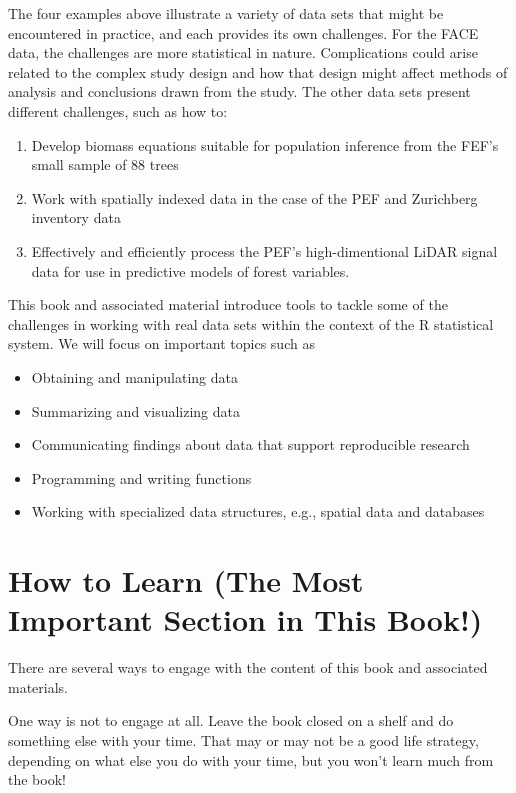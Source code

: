 \documentclass[]{krantz}
\providecommand{\tightlist}{%
  \setlength{\itemsep}{0pt}\setlength{\parskip}{0pt}}
\begin{document}
The four examples above illustrate a variety of data sets that might be encountered in practice, and each provides its own challenges. For the FACE data, the challenges are more statistical in nature. Complications could arise related to the complex study design and how that design might affect methods of analysis and conclusions drawn from the study. The other data sets present different challenges, such as how to:

\begin{enumerate}
\def\labelenumi{\arabic{enumi}.}
\tightlist
\item
  Develop biomass equations suitable for population inference from the FEF's small sample of 88 trees
\item
  Work with spatially indexed data in the case of the PEF and Zurichberg inventory data
\item
  Effectively and efficiently process the PEF's high-dimentional LiDAR signal data for use in predictive models of forest variables.
\end{enumerate}

This book and associated material introduce tools to tackle some of the challenges in working with real data sets within the context of the R statistical system. We will focus on important topics such as

\begin{itemize}
\tightlist
\item
  Obtaining and manipulating data
\item
  Summarizing and visualizing data
\item
  Communicating findings about data that support reproducible research
\item
  Programming and writing functions
\item
  Working with specialized data structures, e.g., spatial data and databases
\end{itemize}

\hypertarget{how-to-learn-the-most-important-section-in-this-book}{%
\section{How to Learn (The Most Important Section in This Book!)}\label{how-to-learn-the-most-important-section-in-this-book}}

There are several ways to engage with the content of this book and associated materials.

One way is not to engage at all. Leave the book closed on a shelf and do something else with your time. That may or may not be a good life strategy, depending on what else you do with your time, but you won't learn much from the book!
\end{document}

